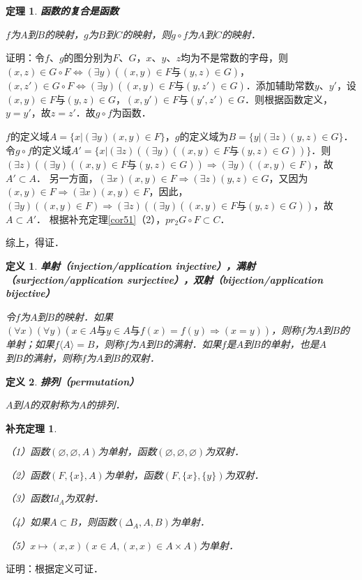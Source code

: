 \documentclass[12pt, a4paper, oneside]{book}
\newtheorem{theo}{定理}
\newtheorem{cor}{补充定理}
\newtheorem{de}{定义}
\begin{document}
			\begin{theo}\label{theo17}
				\textbf{函数的复合是函数}
				\par
				$f$为$A$到$B$的映射，$g$为$B$到$C$的映射，则$g\circ f$为$A$到$C$的映射．
			\end{theo}
			证明：令$f$、$g$的图分别为$F$、$G$，$x$、$y$、$z$均为不是常数的字母，则$(x, z)\in G\circ F\Leftrightarrow (\exists y)((x, y)\in F\text{与}(y, z)\in G)$，$(x, z')\in G\circ F\Leftrightarrow (\exists y)((x, y)\in F\text{与}(y, z')\in G)$．添加辅助常数$y$、$y'$，设$(x, y)\in F\text{与}(y, z)\in G$，$(x, y')\in F\text{与}(y', z')\in G$．则根据函数定义，$y=y'$，故$z=z'$．故$g\circ f$为函数．
			\par
			$f$的定义域$A=\{x|(\exists y)(x, y)\in F\}$，$g$的定义域为$B=\{y|(\exists z)(y, z)\in G\}$．令$g\circ f$的定义域$A'=\{x|(\exists z)((\exists y)((x, y)\in F\text{与}(y, z)\in G))\}$．则$(\exists z)((\exists y)((x, y)\in F\text{与}(y, z)\in G))\Rightarrow (\exists y)((x, y)\in F)$，故$A'\subset A$．
			另一方面，$(\exists x)(x, y)\in F\Rightarrow (\exists z)(y, z)\in G$，又因为$(x, y)\in F\Rightarrow (\exists x)(x, y)\in F$，因此，$(\exists y)((x, y)\in F)\Rightarrow (\exists z)((\exists y)((x, y)\in F\text{与}(y, z)\in G))$，故$A\subset A'$．
			根据补充定理\ref{cor51}（2），$pr_2G\circ F\subset C$．
			\par
			综上，得证．
	
			\begin{de}
				\textbf{单射（injection/application injective），满射（surjection/application surjective），双射（bijection/application bijective）}
				\par
				令$f$为$A$到$B$的映射．如果$(\forall x)(\forall y)(x\in A\text{与}y\in A\text{与}f(x)=f(y)\Rightarrow (x=y))$，则称$f$为$A$到$B$的单射；如果$f\langle A \rangle =B$，则称$f$为$A$到$B$的满射．如果$f$是$A$到$B$的单射，也是$A$\\到$B$的满射，则称$f$为$A$到$B$的双射．
			\end{de}

			\begin{de}
				\textbf{排列（permutation）}
				\par
				$A$到$A$的双射称为$A$的排列．
			\end{de}
			
			\begin{cor}\label{cor74}
				\hfill\par
				（1）函数$(\varnothing, \varnothing, A)$为单射，函数$(\varnothing, \varnothing, \varnothing)$为双射．
				\par
				（2）函数$(F, \{x\}, A)$为单射，函数$(F, \{x\}, \{y\})$为双射．
				\par
				（3）函数$Id_A$为双射．
				\par
				（4）如果$A\subset B$，则函数$(\Delta_A, A, B)$为单射．
				\par
				（5）$x\mapsto (x, x)(x\in A, (x, x)\in A\times A)$为单射．
			\end{cor}
			证明：根据定义可证．				
\end{document}
